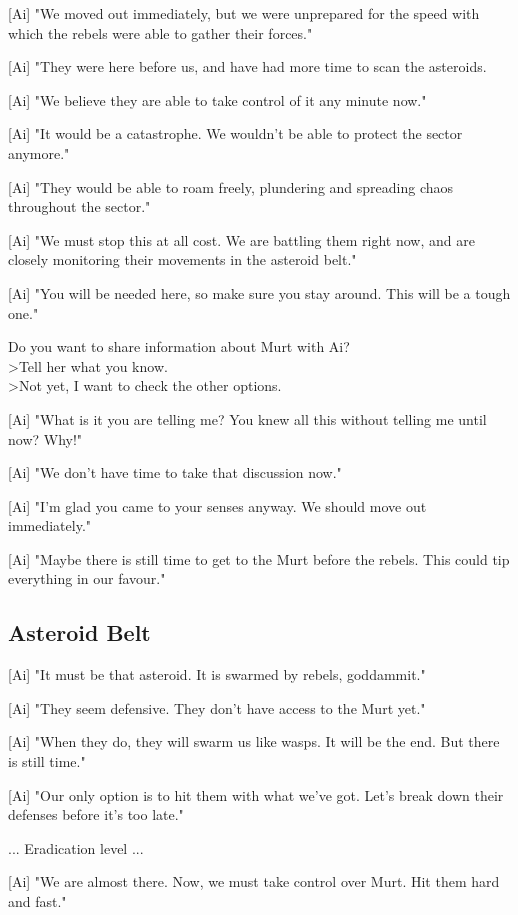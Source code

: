 \documentclass[a4paper,12pt]{article}
\begin{document}
[Ai] "We moved out immediately, but we were unprepared for the speed with which the rebels were able to gather their forces."

[Ai] "They were here before us, and have had more time to scan the asteroids. 

[Ai] "We believe they are able to take control of it any minute now."

[Ai] "It would be a catastrophe. We wouldn't be able to protect the sector anymore." 

[Ai] "They would be able to roam freely, plundering and spreading chaos throughout the sector."

[Ai] "We must stop this at all cost. We are battling them right now, and are closely monitoring their movements in
the asteroid belt."

[Ai] "You will be needed here, so make sure you stay around. This will be a tough one."

Do you want to share information about Murt with Ai?\\
\textgreater Tell her what you know.\\
\textgreater Not yet, I want to check the other options.

[Ai] "What is it you are telling me? You knew all this without telling me until now? Why!"

[Ai] "We don't have time to take that discussion now." 

[Ai] "I'm glad you came to your senses anyway. We should move out immediately."

[Ai] "Maybe there is still time to get to the Murt before the rebels. This could tip everything in our favour."

\subsection{Asteroid Belt}

[Ai] "It must be that asteroid. It is swarmed by rebels, goddammit."

[Ai] "They seem defensive. They don't have access to the Murt yet." 

[Ai] "When they do, they will swarm us like wasps. It will be the end. But there is still time."

[Ai] "Our only option is to hit them with what we've got. Let's break down their defenses before it's too late."

... Eradication level ...

[Ai] "We are almost there. Now, we must take control over Murt. Hit them hard and fast."
\end{document}
